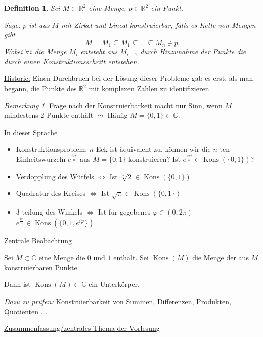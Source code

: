 \documentclass[a4paper,12pt,numbers=noenddot,parskip=full]{scrartcl}
\newcommand{\setR}{\mathbb{R}}
\newcommand{\setC}{\mathbb{C}}
\newcommand{\heading}{\underline}
\DeclareMathOperator{\Kons}{Kons}
\theoremstyle{dotless}
\newtheorem{definition}[theorem]{Definition}
\theoremstyle{remark}
\newtheorem*{remark}{Bemerkung}
\begin{document}
	\begin{definition}
		Sei $M \subset \setR^2$ eine Menge, $p \in \setR^2$ ein Punkt.
		
		Sage: $p$ ist aus $M$ mit Zirkel und Lineal konstruierbar, falls es Kette von Mengen gibt
		\begin{equation*}
			M = M_1 \subseteq M_1 \subseteq \dots \subseteq M_n \ni p
		\end{equation*}
		Wobei $\forall i$ die Menge $M_i$ entsteht aus $M_{i-1}$ durch Hinzunahme der Punkte die durch einen Konstruktionsschritt entstehen.
	\end{definition}

	\heading{Historie:} Einen Durchbruch bei der Lösung dieser Probleme gab es erst, als man begann, die Punkte des $\setR^2$ mit komplexen Zahlen zu identifizieren.
	
	\begin{remark}
		Frage nach der Konstruierbarkeit macht nur Sinn, wenn $M$ mindestens $2$ Punkte enthält $\leadsto$ Häufig $M = \{0,1\} \subset \setC$.
	\end{remark}

	\heading{In dieser Sprache}
	\begin{itemize}
		\item Konstruktionsproblem: $n$-Eck ist äquivalent zu, können wir die $n$-ten Einheitswurzeln $e^{\frac{i 2 \pi}{n}}$ aus $M = \{ 0,1 \}$ konstruieren?
		Ist $e^{\frac{2\pi i}{n}} \in \Kons(\{0,1\})$?
		\item Verdopplung des Würfels $\Leftrightarrow$ Ist $\sqrt[3]{2} \in \Kons(\{0,1\})$
		\item Quadratur des Kreises $\Leftrightarrow$ Ist $\sqrt{\pi} \in \Kons(\{0,1\})$
		\item $3$-teilung des Winkels $\Leftrightarrow$ Ist für gegebenes $\varphi \in (0,2\pi)$ $e^{\frac{i \varphi}{3}} \in \Kons(\{ 0, 1, e^{i \varphi} \})$
	\end{itemize}

	\heading{Zentrale Beobachtung}
	
	Sei $M \subset \setC$ eine Menge die $0$ und $1$ enthält. Sei $\Kons(M)$ die Menge der aus $M$ konstruierbaren Punkte.
	
	Dann ist $\Kons(M) \subset \setC$ ein Unterkörper.
	
	\textit{Dazu zu prüfen:} Konstruierbarkeit von Summen, Differenzen, Produkten, Quotienten \dots.
	
	\heading{Zusammenfassung/zentrales Thema der Vorlesung}
	
\end{document}

